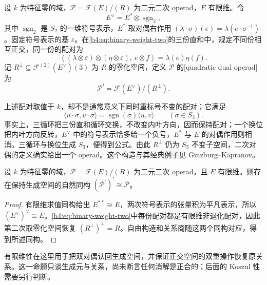 \begin{definition}\label{b4:def:quadratic-dual-operad}
	设 \(k\) 为特征零的域，\(\mathcal P=\mathcal F(E)/(R)\) 为二元二次 operad，\(E\) 有限维。令
	\[
		E^\vee=E^*\otimes\operatorname{sgn}_2,
	\]
	其中 \(\operatorname{sgn}_2\) 是 \(S_2\) 的一维符号表示，\(E^*\) 取对偶右作用 \((\lambda\cdot\sigma)(e)=\lambda(e\cdot\sigma^{-1})\)。固定符号表示的基 \(\varepsilon\)。在\eqref{b4:eq:binary-weight-two}的三份直和中，规定不同份相互正交，同一份的配对为
	\[
		\left\langle(\lambda\otimes\varepsilon)\otimes(\eta\otimes\varepsilon),\ e\otimes f\right\rangle
		=\lambda(e)\eta(f).
	\]
	记 \(R^\perp\subseteq\mathcal F^{(2)}(E^\vee)(3)\) 为 \(R\) 的零化空间，定义 \(\mathcal P\) 的[quadratic dual operad]为
	\[
		\mathcal P^!=\mathcal F(E^\vee)/(R^\perp).
	\]
\end{definition}

上述配对取值于 \(k\)，却不是通常意义下同时重标号不变的配对；它满足
\begin{equation}\label{b4:eq:quadratic-pairing-sign}
	\langle u\cdot\sigma,v\cdot\sigma\rangle=\operatorname{sgn}(\sigma)\langle u,v\rangle
	\qquad(\sigma\in S_3).
\end{equation}
事实上，三循环把三份直和循环交换，不改变内叶方向，因而保持配对；一个换位把内叶方向反转，\(E^\vee\) 中的符号表示恰多给一个负号，\(E^*\) 与 \(E\) 的对偶作用则相消。三循环与换位生成 \(S_3\)，便得到公式。由此 \(R^\perp\) 仍为 \(S_3\) 不变子空间，二次对偶的定义确实给出一个 operad。这个构造与其经典例子见 Ginzburg--Kapranov\cite[Section 2.1]{GinzburgKapranov1994KoszulOperads}。

\begin{proposition}\label{b4:prop:quadratic-operad-bidual}
	设 \(k\) 为特征零的域，\(\mathcal P=\mathcal F(E)/(R)\) 为二元二次 operad，且 \(E\) 有限维。则存在保持生成空间的自然同构 \((\mathcal P^!)^!\cong\mathcal P\)。
\end{proposition}
\begin{proof}
	有限维求值同构给出 \(E^{**}\cong E\)，两次符号表示的张量积为平凡表示，所以 \((E^\vee)^\vee\cong E\)。\eqref{b4:eq:binary-weight-two}中每份配对都是有限维非退化配对，因此第二次取零化空间恢复 \((R^\perp)^\perp=R\)。自由构造和关系商随这两个同构对应，得到所述同构。
\end{proof}

有限维性在这里用于把双对偶认回生成空间，并保证正交空间的双重操作恢复原关系。这一命题只谈生成元与关系，尚未断言任何消解是正合的；后面的 Koszul 性需要另行判断。

